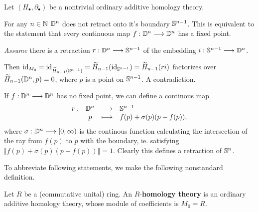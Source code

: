 	\begin{theorem}
		Let $(H_\bullet, \partial_\bullet)$ be a nontrivial ordinary additive homology theory.

		For any $n\in \N$ $\D^n$ does not retract onto it's boundary $\S^{n-1}$. This is equivalent to the statement that every continuous map $f:\D^n --> \D^n$ has a fixed point.
	\end{theorem}
	\begin{sketch}
		\textit{Assume} there is a retraction $r: \D^n --> \S^{n-1}$ of the embedding $i:\S^{n-1} --> \D^n$.
		\begin{tab}[1.3cm]
			Then $\id_{M_0} = \id_{\widetilde{H}_{n-1}(\S^{n-1})} = \widetilde{H}_{n-1}(\id_{\S^{n-1}}) = \widetilde{H}_{n-1}(ri)$ factorizes over $\widetilde{H}_{n-1}(\D^n,p) = 0$, where $p$ is a point on $\S^{n-1}$. A contradiction.
		\end{tab}

		If $f:\D^n --> \D^n$ has no fixed point, we can define a continous map 
		\begin{equation*}
			\begin{array}{rccl}
				r:&\D^n & \longrightarrow & \S^{n-1}\\
				&p & \longmapsto & f(p) + \sigma(p)(p - f(p)),
			\end{array}
		\end{equation*}
		where $\sigma:\D^n --> [0,\infty)$ is the continous function calculating the intersection of the ray from $f(p)$ to $p$ with the boundary, ie. satisfying $\Vert f(p) + \sigma(p)(p - f(p))\Vert = 1$. Clearly this defines a retraction of $\S^n$.

	\end{sketch}

	\begin{lemma}
	\end{lemma}

	\begin{lemma}
	\end{lemma}

	To abbreviate following statements, we make the following nonstandard definition.

	\begin{definition}
		Let $R$ be a (commutative unital) ring. An $R$-\textbf{homology theory} is an ordinary additive homology theory, whose module of coefficients is $M_0 = R$.
	\end{definition}

